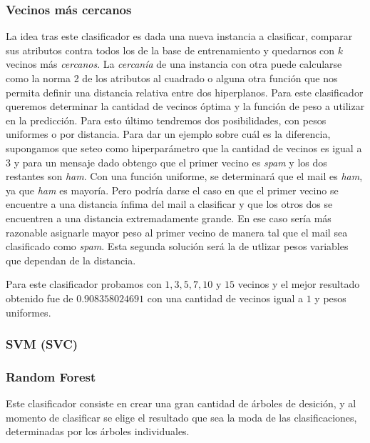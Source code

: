
\subsubsection{Vecinos más cercanos}

La idea tras este clasificador es dada una nueva instancia a clasificar, comparar sus atributos contra todos los de la base de entrenamiento y quedarnos con $k$ vecinos más \textit{cercanos}. La \textit{cercanía} de una instancia con otra puede calcularse como la norma 2 de los atributos al cuadrado o alguna otra función que nos permita definir una distancia relativa entre dos hiperplanos. Para este clasificador queremos determinar la cantidad de vecinos óptima y la función de peso a utilizar en la predicción. Para esto último tendremos dos posibilidades, con pesos uniformes o por distancia. Para dar un ejemplo sobre cuál es la diferencia, supongamos que seteo como hiperparámetro que la cantidad de vecinos es igual a $3$ y para un mensaje dado obtengo que el primer vecino es \textit{spam} y los dos restantes son \textit{ham}. Con una función uniforme, se determinará que el mail es \textit{ham}, ya que \textit{ham} es mayoría. Pero podría darse el caso en que el primer vecino se encuentre a una distancia ínfima del mail a clasificar y que los otros dos se encuentren a una distancia extremadamente grande. En ese caso sería más razonable asignarle mayor peso al primer vecino de manera tal que el mail sea clasificado como \textit{spam}. Esta segunda solución será la de utlizar pesos variables que dependan de la distancia.

Para este clasificador probamos con $1,3,5,7,10$ y $15$ vecinos y el mejor resultado obtenido fue de $0.908358024691$ con una cantidad de vecinos igual a $1$ y pesos uniformes.


\subsubsection{SVM (SVC)}


\subsubsection{Random Forest}

Este clasificador consiste en crear una gran cantidad de árboles de desición, y al momento de clasificar se elige el resultado que sea la moda de las clasificaciones, determinadas por los árboles individuales.

